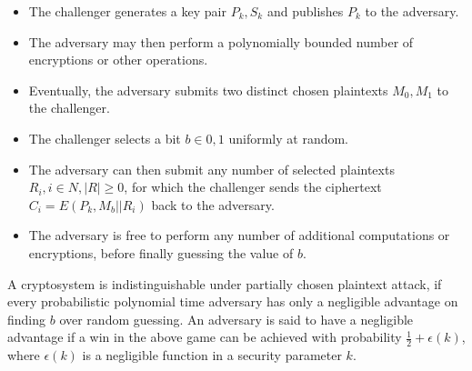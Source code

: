 \begin{itemize} \item The challenger generates a key pair \begin{math}P_k,
S_k\end{math} and publishes \begin{math}P_k\end{math} to the adversary.  \item
The adversary may then perform a polynomially bounded number of encryptions or
other operations.  \item Eventually, the adversary submits two distinct chosen
plaintexts \begin{math}M_0, M_1\end{math} to the challenger.  \item The
challenger selects a bit \begin{math}b\in{0, 1}\end{math} uniformly at random.
\item The adversary can then submit any number of selected plaintexts
\begin{math}R_i, i\in N, |R| \geq 0\end{math}, for which the challenger sends
the ciphertext \begin{math}C_i = E(P_k, M_b||R_i)\end{math} back to the
adversary.  \item The adversary is free to perform any number of additional
computations or encryptions, before finally guessing the value of
\begin{math}b\end{math}.  \end{itemize}

A cryptosystem is indistinguishable under partially chosen plaintext attack, if
every probabilistic polynomial time adversary has only a negligible advantage on
finding \begin{math}b\end{math} over random guessing. An adversary is said to
have a negligible advantage if a win in the above game can be achieved with
probability \begin{math}\frac{1}{2} + \epsilon(k)\end{math}, where
\begin{math}\epsilon(k)\end{math} is a negligible function in a security
parameter \begin{math}k\end{math}.

